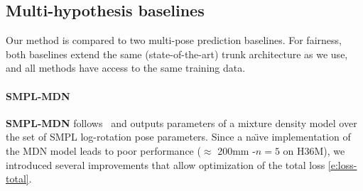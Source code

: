 \subsection{Multi-hypothesis baselines} \label{s:multi_baselines}

Our method is compared to two multi-pose prediction baselines. For fairness, both baselines extend the same (state-of-the-art) trunk architecture as we use, and all methods have access to the same training data. 


\paragraph{SMPL-MDN}

\textbf{SMPL-MDN} follows~\cite{li19generating} and outputs parameters of a mixture density model over the set of SMPL log-rotation pose parameters. 
Since a na\"{\i}ve implementation of the MDN model leads to poor performance ($\approx$ 200mm \MPJPE-$n=5$ on H36M), we introduced several improvements that allow optimization of the total loss \cref{e:loss-total}.


